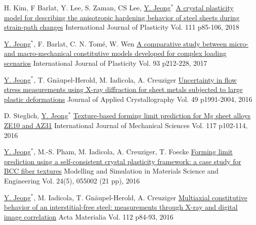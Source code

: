\begin{cventries}
  \cventry
  {H. Kim, F Barlat, Y. Lee, S. Zaman, CS Lee, \underline{Y. Jeong}$^*$}
  {\href{https://doi.org/10.1016/j.ijplas.2018.07.010}{A crystal plasticity model for describing the anisotropic hardening behavior of steel sheets during strain-path changes}}
  {International Journal of Plasticity}
  {Vol. 111 p85-106, 2018}
  {
  }

  \cventry
  {\underline{Y. Jeong}$^*$, F. Barlat, C. N. Tom\'{e}, W. Wen}
  {\href{http://dx.doi.org/10.1016/j.ijplas.2016.07.015}{A comparative study between micro- and macro-mechanical constitutive models developed for complex loading scenarios}}
  {International Journal of Plasticity}
  {Vol. 93 p212-228, 2017} %
  {
  }

  \cventry
  {\underline{Y. Jeong}$^*$, T. Gn\"{a}upel-Herold, M. Iadicola, A. Creuziger} %
  {\href{https://doi.org/10.1107/S1600576716013662}{Uncertainty in flow stress measurements using X-ray diffraction for sheet metals subjected to large plastic deformations}} %
  {Journal of Applied Crystallography} %
  {Vol. 49 p1991-2004, 2016} %
  {
  }

  \cventry
  {D. Steglich, \underline{Y. Jeong}$^*$}
  {\href{http://dx.doi.org/10.1016/j.ijmecsci.2016.08.013}{Texture-based forming limit prediction for Mg sheet alloys ZE10 and AZ31}}
  {International Journal of Mechanical Sciences} %
  {Vol. 117 p102-114, 2016} %
  {
  }

  \cventry
  {\underline{Y. Jeong}$^*$, M.-S. Pham, M. Iadicola, A. Creuziger, T. Foecke}
  {\href{http://dx.doi.org/10.1088/0965-0393/24/5/055005}{Forming limit prediction using a self-consistent crystal plasticity framework: a case study for BCC fiber textures}}
  {Modelling and Simulation in Materials Science and Engineering}
  {Vol. 24(5), 055002 (21 pp), 2016} %
  {
  }

  \cventry
  {\underline{Y. Jeong}$^*$, M. Iadicola, T. Gn\"{a}upel-Herold, A. Creuziger}
  {\href{http://dx.doi.org/10.1016/j.actamat.2016.04.013}{Multiaxial constitutive behavior of an interstitial-free steel: measurements through X-ray and digital image correlation}}
  {Acta Materialia }
  {Vol. 112 p84-93, 2016}
  {
  }



\end{cventries}
